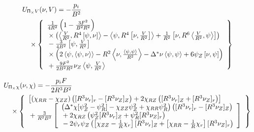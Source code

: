 \documentclass[letterpaper]{book}
\newcommand{\tensor}[1]{\mathsf{#1}}
\renewcommand{\P}{\tensor{\Pi}}
\newcommand{\gs}[1]{\Delta^* #1}
\newcommand{\pb}[2]{\left[#1,#2\right]}
\newcommand{\ip}[2]{\left\langle  #1,#2\right\rangle}
\begin{document}
\begin{eqnarray*}
  & \lefteqn{U_{\P_\times V}(\nu, V) = -\frac{p_i}{B^2}} &
  \\ && \mbox{} \times
  \left\{ \begin{array}{l}
      \frac{1}{4 R^2} \left(1 - \frac{3 F^2}{B^2 R^2} \right) 
      \\ \mbox{} \times
      \left( \ip{\frac{V}{R^2}}{R^4 \pb{\psi}{\nu}}
            -\ip{\psi}{R^4\pb{\nu}{\frac{V}{R^2}}}
	    +\frac{1}{R^2}\pb{\nu}{R^6\ip{\frac{V}{R^2}}{\psi}} \right)
      \\ \mbox{}
      -\frac{3}{4 B^2} \pb{\psi}{\frac{V}{R^2}}
      \\ \mbox{} \times
      \left( 2 \ip{\psi}{\ip{\psi}{\nu}}
           - R^2 \ip{\nu}{\frac{\ip{\psi}{\psi}}{R^2}}
	   - \gs{\nu} \ip{\psi}{\psi}
	   + 6 \psi_Z \pb{\nu}{\psi} \right)
      \\ \mbox{}
      +\frac{9 F^2}{2 B^2 R^2} \nu_Z \ip{\psi}{\frac{V}{R^2}}
    \end{array} \right\}
\end{eqnarray*}

\begin{eqnarray*}
  & \lefteqn{U_{\P_\times \chi}(\nu, \chi) = -\frac{p_i F}{2 R^3 B^2}} &
  \\ && \mbox{} \times 
  \left\{ \begin{array}{l}
    \left[ \left( \chi_{R R} - \chi_{Z Z} \right)
           \left( [R^3 \nu_r]_r - [R^3 \nu_Z]_Z \right)
       +   2 \chi_{R Z} 
           \left( [R^3 \nu_r]_Z + [R^3 \nu_Z]_r \right)
           \right]
    \\ \mbox{}
    + \frac{3}{R^2 B^2} \left[ \begin{array}{l} 
	\left( \gs{\chi}[\psi_Z^2 - \psi_R^2] 
        - \chi_{Z Z} \psi_Z^2 + \chi_{R R} \psi_R^2 \right)
	\left( [R^3 \nu_r]_r - [R^3 \nu_Z]_Z \right)
	\\ \mbox{} + 2 \chi_{R Z} 
	\left( \psi_Z^2 [R^3 \nu_r]_Z
	      +\psi_R^2 [R^3 \nu_Z]_r \right)
	\\ \mbox{} - 2 \psi_r \psi_Z 
	\left( \left[\chi_{Z Z} - \frac{1}{R}\chi_r \right] [R^3 \nu_r]_Z
	      +\left[\chi_{R R} - \frac{1}{R}\chi_r \right][R^3 \nu_Z]_r 
	      \right)
      \end{array} \right]
  \end{array} \right\}
\end{eqnarray*}
\end{document}
